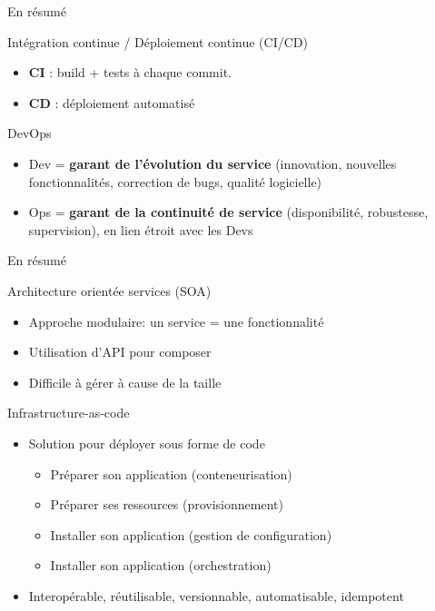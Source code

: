 \documentclass[aspectratio=169,10pt]{beamer}
\begin{document}
\begin{frame}{En résumé}

\begin{alertblock}{Intégration continue / Déploiement continue (CI/CD)}
  \begin{itemize}
        \item \textbf{CI} : build + tests à chaque commit.
      \item \textbf{CD} : déploiement automatisé 
  \end{itemize}
\end{alertblock}

\begin{alertblock}{DevOps}
  \begin{itemize}
    \item Dev = \textbf{garant de l’évolution du service} (innovation, nouvelles fonctionnalités, correction de bugs, qualité logicielle)
    \item Ops = \textbf{garant de la continuité de service} (disponibilité, robustesse, supervision), en lien étroit avec les Devs
  \end{itemize}
\end{alertblock}


\end{frame}


\begin{frame}{En résumé}

\begin{alertblock}{Architecture orientée services (SOA)}
  \begin{itemize}
    \item Approche modulaire: un service = une fonctionnalité
    \item Utilisation d'API pour composer
    \item Difficile à gérer à cause de la taille
  \end{itemize}
\end{alertblock}

\begin{alertblock}{Infrastructure-as-code}
  \begin{itemize}
    \item Solution pour déployer sous forme de code
    \begin{itemize}
        \item Préparer son application (conteneurisation)
        \item Préparer ses ressources (provisionnement)
        \item Installer son application (gestion de configuration)
        \item Installer son application (orchestration)
    \end{itemize}
    \item Interopérable, réutilisable, versionnable, automatisable, idempotent
  \end{itemize}
\end{alertblock}

\end{frame}
\end{document}
